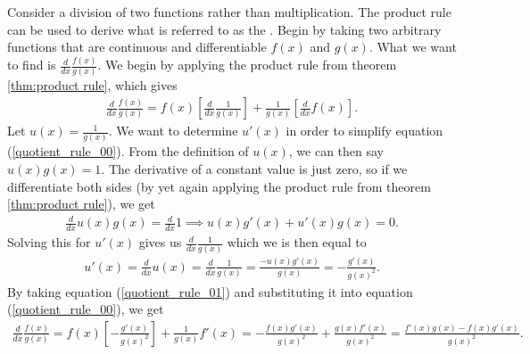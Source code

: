 Consider a division of two functions rather than multiplication. The product rule can be used to derive what is referred to as the . Begin by taking two arbitrary functions that are continuous and differentiable $f(x)$ and $g(x)$. What we want to find is $\frac{d}{dx} \frac{f(x)}{g(x)}$. We begin by applying the product rule from theorem \ref{thm:product rule}, which gives
\begin{align}
	\frac{d}{dx} \frac{f(x)}{g(x)} = f(x)\left[\frac{d}{dx} \frac{1}{g(x)}\right] + \frac{1}{g(x)}\left[\frac{d}{dx} f(x)\right] \label{quotient_rule_00}.
\end{align}
Let $u(x)=\frac{1}{g(x)}$. We want to determine $u'(x)$ in order to simplify equation (\ref{quotient_rule_00}). From the definition of $u(x)$, we can then say $u(x)g(x)=1$. The derivative of a constant value is just zero, so if we differentiate both sides (by yet again applying the product rule from theorem \ref{thm:product rule}), we get
\begin{align}
	\frac{d}{dx}u(x)g(x)=\frac{d}{dx}1 \implies u(x)g'(x) + u'(x)g(x)=0.
\end{align}
Solving this for $u'(x)$ gives us $\frac{d}{dx} \frac{1}{g(x)}$ which we is then equal to 
\begin{align}
	u'(x) = \frac{d}{dx} u(x) = \frac{d}{dx} \frac{1}{g(x)} = \frac{-u(x)g'(x)}{g(x)} = -\frac{g'(x)}{g(x)^2} \label{quotient_rule_01}.
\end{align}
By taking equation (\ref{quotient_rule_01}) and substituting it into equation (\ref{quotient_rule_00}), we get
\begin{align}
	\frac{d}{dx} \frac{f(x)}{g(x)} = f(x)\left[-\frac{g'(x)}{g(x)^2}\right] + \frac{1}{g(x)}f'(x) = -\frac{f(x)g'(x)}{g(x)^2}+ \frac{g(x)f'(x)}{g(x)^2} = \frac{f'(x)g(x)-f(x)g'(x)}{g(x)^2}.
\end{align}

